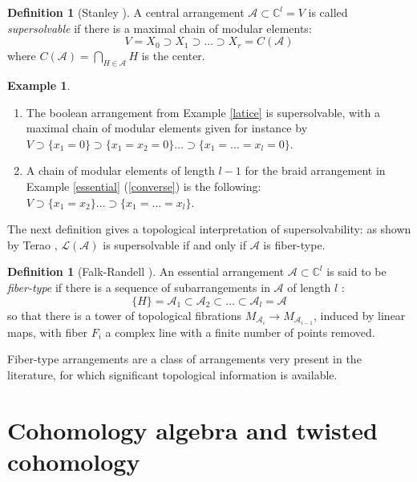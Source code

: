 \documentclass[psamsfonts]{conm-p-l}
\theoremstyle{definition}
\newtheorem{definition}[theorem]{Definition}
\newtheorem{example}[theorem]{Example}
\theoremstyle{remark}
\numberwithin{equation}{section}
\newcommand{\A}{{\mathcal A}}
\begin{document}
\begin{definition}[Stanley \cite{St}]
\label{stanley}
A central arrangement $\A\subset \mathbb{C}^{l}=V$  is called {\em supersolvable} if there is a 
maximal chain of modular elements:
\begin{equation}
\label{eq:21}
V=X_{0}\supset X_{1}\supset\dots \supset X_{r}=C(\A)
\end{equation}
where $C(\A)= \bigcap_{H \in \A}H$ is the center.
\end{definition}


\begin{example}
\begin{enumerate}
\item \label{bool3}
The boolean arrangement from Example \ref{latice} is supersolvable, 
with a maximal chain of modular elements given for instance by 
$V \supset \{x_1=0\}\supset \{x_1=x_2=0\} \dots \supset \{x_1= \dots=x_l=0\}$.
\item \label{braidchain}
A chain of modular elements of length $l-1$ for the braid arrangement in Example 
\ref{essential} (\ref{converse}) is the following: 
$V \supset \{x_1=x_2\} \dots \supset \{x_1= \dots=x_l\}$.
\end{enumerate}
\end{example}

The next definition gives a topological interpretation 
of supersolvability: as shown by Terao \cite{Te}, $\mathcal L(\A)$ is supersolvable
if and only if $\A$ is fiber-type.

\begin{definition}[Falk-Randell \cite{FR0}]
\label{fibertype}
An essential arrangement $\A \subset \mathbb{C}^{l}$  is said to be {\em fiber-type} if there is 
a sequence of subarrangements
in $\A$ of length $l$ :
%
\begin{equation}
\label{eq:22}
\{ H \}=\A_{1} \subset \A_{2} \subset \dots \subset \A_{l}=\A
\end{equation}
so that there is a tower of topological fibrations $M_{\A_{i}}\longrightarrow M_{\A_{i-1}}$, 
induced by linear maps, with fiber $F_i$ a complex line with a finite number of points removed.
\end{definition}


Fiber-type arrangements are a class of arrangements very present in the literature,
for which significant topological information is available.
 
 

\section{Cohomology algebra and twisted cohomology}
\label{sect:cohomology}
\end{document}
